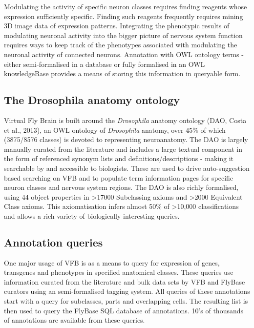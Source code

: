 \documentclass[runningheads,a4paper]{llncs}
\begin{document}
Modulating the activity of specific neuron classes requires finding
reagents whose expression sufficiently specific. Finding such reagents
frequently requires mining 3D image data of expression patterns.
Integrating the phenotypic results of modulating neuronal activity
into the bigger picture of nervous system function requires ways to
keep track of the phenotypes associated with modulating the neuronal
activity of connected neurons.  Annotation with OWL ontology terms -
either semi-formalised in a database or fully formalised in an OWL
knowledgeBase provides a means of storing this information in
queryable form.

\subsection{The Drosophila anatomy ontology}

Virtual Fly Brain is built around the \textit{Drosophila} anatomy
ontology (DAO, Costa et al., 2013), an OWL ontology of
\textit{Drosophila} anatomy, over 45\% of which (3875/8576 classes) is
devoted to representing neuroanatomy. The DAO is largely manually
curated from the literature and includes a large textual component in
the form of referenced synonym lists and definitions/descriptions -
making it searchable by and accessible to biologists.  These are used
to drive auto-suggestion based searching on VFB and to populate term
information pages for specific neuron classes and nervous system
regions. The DAO is also richly formalised, using 44 object properties
in \textgreater 17000 Subclassing axioms and \textgreater 2000
Equivalent Class axioms.  This axiomatisation infers almost 50\% of
\textgreater 10,000 classifications and allows a rich variety of
biologically interesting queries.

\subsection{Annotation queries}

One major usage of VFB is as a means to query for expression of genes,
transgenes and phenotypes in specified anatomical classes.  These
queries use information curated from the literature and bulk data sets
by VFB and FlyBase curators using an semi-formalised tagging
system. All queries of these annotations start with a query for
subclasses, parts and overlapping cells.  The resulting list is then
used to query the FlyBase SQL database of annotations.  10's of
thousands of annotations are available from these queries.
\end{document}
